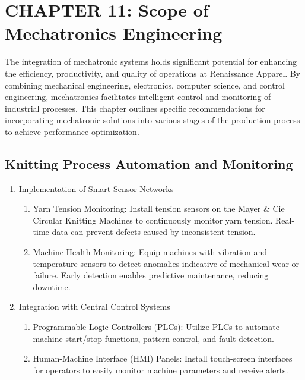 \section{CHAPTER 11: Scope of Mechatronics Engineering}
The integration of mechatronic systems holds significant potential for enhancing the efficiency, productivity, and quality of operations at Renaissance Apparel. By combining mechanical engineering, electronics, computer science, and control engineering, mechatronics facilitates intelligent control and monitoring of industrial processes. This chapter outlines specific recommendations for incorporating mechatronic solutions into various stages of the production process to achieve performance optimization.

\subsection{Knitting Process Automation and Monitoring}
\begin{enumerate}
    \item Implementation of Smart Sensor Networks
    \begin{enumerate}
        \item Yarn Tension Monitoring: Install tension sensors on the Mayer \& Cie Circular Knitting Machines to continuously monitor yarn tension. Real-time data can prevent defects caused by inconsistent tension.
        \item Machine Health Monitoring: Equip machines with vibration and temperature sensors to detect anomalies indicative of mechanical wear or failure. Early detection enables predictive maintenance, reducing downtime.
    \end{enumerate}
    \item Integration with Central Control Systems
    \begin{enumerate}
        \item Programmable Logic Controllers (PLCs): Utilize PLCs to automate machine start/stop functions, pattern control, and fault detection.
        \item Human-Machine Interface (HMI) Panels: Install touch-screen interfaces for operators to easily monitor machine parameters and receive alerts.
    \end{enumerate}
\end{enumerate}

